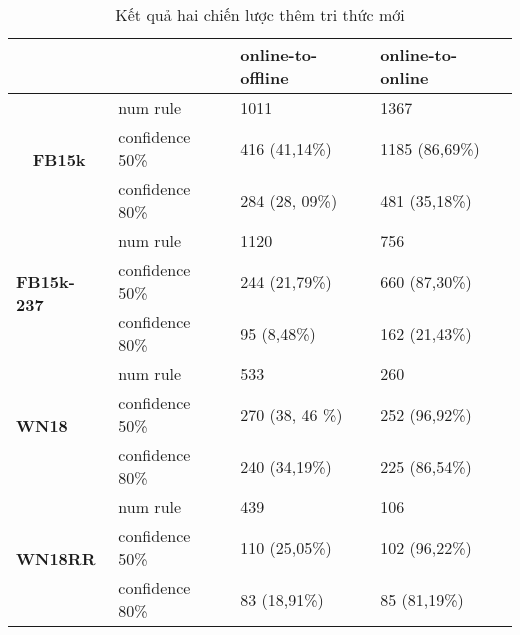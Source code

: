 \begin{table}[ht]
	\begin{center}
		\begin{tabular}{ll|l|l|}
			\cline{3-4}
			& & \textbf{online-to-offline} & \textbf{online-to-online} \\ \hline
			\multicolumn{1}{|c|}{\multirow{3}{*}{\textbf{FB15k}}}     & num rule        & 1011                       & 1367                      \\ \cline{2-4} 
			\multicolumn{1}{|c|}{}& confidence 50\% & 416 (41,14\%)              & 1185 (86,69\%)            \\ \cline{2-4} 
			\multicolumn{1}{|c|}{}& confidence 80\% & 284 (28, 09\%)             & 481 (35,18\%)             \\ \hline
			\multicolumn{1}{|l|}{\multirow{3}{*}{\textbf{FB15k-237}}} & num rule        & 1120                       & 756                       \\ \cline{2-4} 
			\multicolumn{1}{|l|}{}& confidence 50\% & 244 (21,79\%)              & 660 (87,30\%)             \\ \cline{2-4} 
			\multicolumn{1}{|l|}{}& confidence 80\% & 95 (8,48\%)                & 162 (21,43\%)             \\ \hline
			\multicolumn{1}{|l|}{\multirow{3}{*}{\textbf{WN18}}}      & num rule        & 533                        & 260                       \\ \cline{2-4} 
			\multicolumn{1}{|l|}{}& confidence 50\% & 270 (38, 46 \%)            & 252 (96,92\%)             \\ \cline{2-4} 
			\multicolumn{1}{|l|}{}& confidence 80\% & 240 (34,19\%)              & 225 (86,54\%)             \\ \hline
			\multicolumn{1}{|l|}{\multirow{3}{*}{\textbf{WN18RR}}}    & num rule        & 439                        & 106                       \\ \cline{2-4} 
			\multicolumn{1}{|l|}{}& confidence 50\% & 110 (25,05\%)              & 102 (96,22\%)             \\ \cline{2-4} 
			\multicolumn{1}{|l|}{}& confidence 80\% & 83 (18,91\%)               & 85 (81,19\%)              \\ \hline
		\end{tabular}
		\caption{Kết quả hai chiến lược thêm tri thức mới}
		\label{tab:tab3}%
	\end{center}
\end{table}



